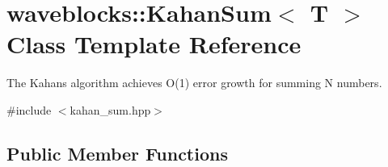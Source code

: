 \hypertarget{classwaveblocks_1_1_kahan_sum}{}\section{waveblocks\+:\+:Kahan\+Sum$<$ T $>$ Class Template Reference}
\label{classwaveblocks_1_1_kahan_sum}


The Kahan\textquotesingle{}s algorithm achieves O(1) error growth for summing N numbers.  




{\ttfamily \#include $<$kahan\+\_\+sum.\+hpp$>$}

\subsection*{Public Member Functions}
